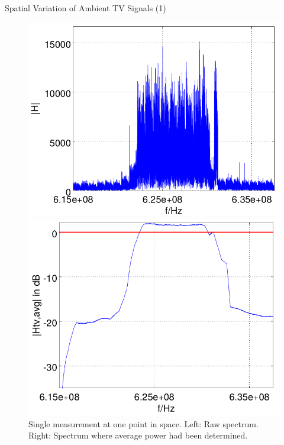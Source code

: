 \documentclass[apectratio=169]{beamer}
\begin{document}
\begin{frame}{Spatial Variation of Ambient TV Signals (1)}
\begin{figure}[h]
	\centering
	\begin{minipage}{0.49\columnwidth}
		\includegraphics[width=\columnwidth]{./fig/626mhz_raw}
	\end{minipage}
	\hfill
	\begin{minipage}{0.49\columnwidth}
		\includegraphics[width=\columnwidth]{./fig/626mhz_filtered}
	\end{minipage}
	\caption{Single measurement at one point in space. Left: Raw spectrum. Right: Spectrum where average power had been determined.}
	\label{fig:tv_record} 
	\end{figure}
\end{frame}
\end{document}
